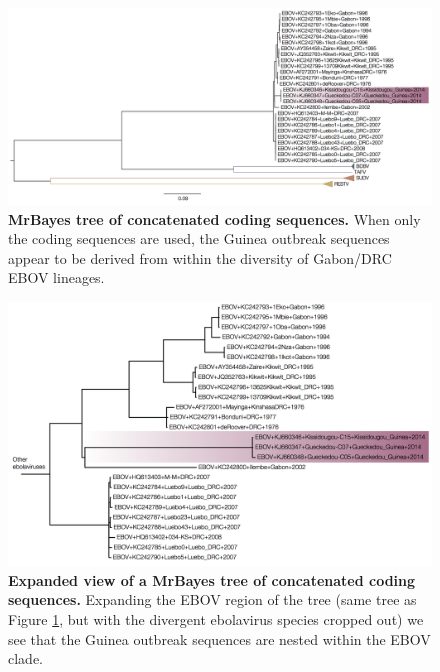 \documentclass[11pt,oneside,letterpaper]{article}
\begin{document}
\begin{figure}[h!]
\centering  
\includegraphics[width=1\textwidth]  {figures/ebolavirus_cds_mb_tree.png}
\caption{\textbf{MrBayes tree of concatenated coding sequences.}	
When only the coding sequences are used, the Guinea outbreak sequences appear to be derived from within the diversity of Gabon/DRC EBOV lineages.}
\label{MBtreeCDS}
\end{figure}

\begin{figure}[h!]
\centering  
\includegraphics[width=1\textwidth]  {figures/EBOV_cds_mb_tree.png}
\caption{\textbf{Expanded view of a MrBayes tree of concatenated coding sequences.}
Expanding the EBOV region of the tree (same tree as Figure \ref{MBtreeCDS}, but with the divergent ebolavirus species cropped out) we see that the Guinea outbreak sequences are nested within the EBOV clade.}
\label{MBtreeCDSzoomed}
\end{figure}
\end{document}
